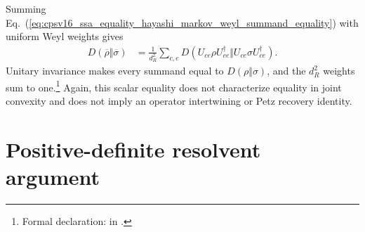 \documentclass[11pt]{article}
\begin{document}
Summing
Eq.~(\ref{eq:cpsv16_ssa_equality_hayashi_markov_weyl_summand_equality}) with
uniform Weyl weights gives
\begin{align}
    D(\overline\rho\Vert\overline\sigma)
        &=
        \frac{1}{d_R^2}\sum_{c,e}
        D(U_{ce}\rho U_{ce}^\dagger
            \Vert U_{ce}\sigma U_{ce}^\dagger).
    \label{eq:cpsv16_ssa_equality_hayashi_markov_weyl_jensen_equality}
\end{align}
Unitary invariance makes every summand equal to $D(\rho\Vert\sigma)$, and the
$d_R^2$ weights sum to one.\footnote{Formal declaration:
 in
.}
Again, this scalar equality does not characterize equality in joint convexity
and does not imply an operator intertwining or Petz recovery identity.

\section{Positive-definite resolvent argument}
\end{document}
